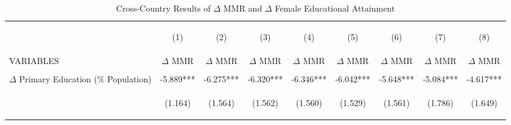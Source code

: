 \begin{landscape}\begin{table}[htpb!]\begin{center}\caption{Cross-Country Results of $\Delta$ MMR and $\Delta$ Female Educational Attainment}\label{MMRtab:MMRDelta}\begin{tabular}{lcccccccc}\toprule&\begin{footnotesize}(1)\end{footnotesize}&\begin{footnotesize}(2)\end{footnotesize}&\begin{footnotesize}(3)\end{footnotesize}&\begin{footnotesize}(4)\end{footnotesize}&\begin{footnotesize}(5)\end{footnotesize}&\begin{footnotesize}(6)\end{footnotesize}&\begin{footnotesize}(7)\end{footnotesize}&\begin{footnotesize}(8) \end{footnotesize}\\
VARIABLES&$\Delta$ MMR&$\Delta$ MMR&$\Delta$ MMR&$\Delta$ MMR&$\Delta$ MMR&$\Delta$ MMR&$\Delta$ MMR&$\Delta$ MMR\\ \midrule
&&&&&&&&\\
$\Delta$ Primary Education (\% Population) &-5.889***&-6.275***&-6.320***&-6.346***&-6.042***&-5.648***&-5.084***&-4.617***\\
&\begin{footnotesize}(1.164)\end{footnotesize}&\begin{footnotesize}(1.564)\end{footnotesize}&\begin{footnotesize}(1.562)\end{footnotesize}&\begin{footnotesize}(1.560)\end{footnotesize}&\begin{footnotesize}(1.529)\end{footnotesize}&\begin{footnotesize}(1.561)\end{footnotesize}&\begin{footnotesize}(1.786)\end{footnotesize}&\begin{footnotesize}(1.649)\end{footnotesize}\\

\end{tabular}
\end{center}
\end{table}
\end{landscape}
